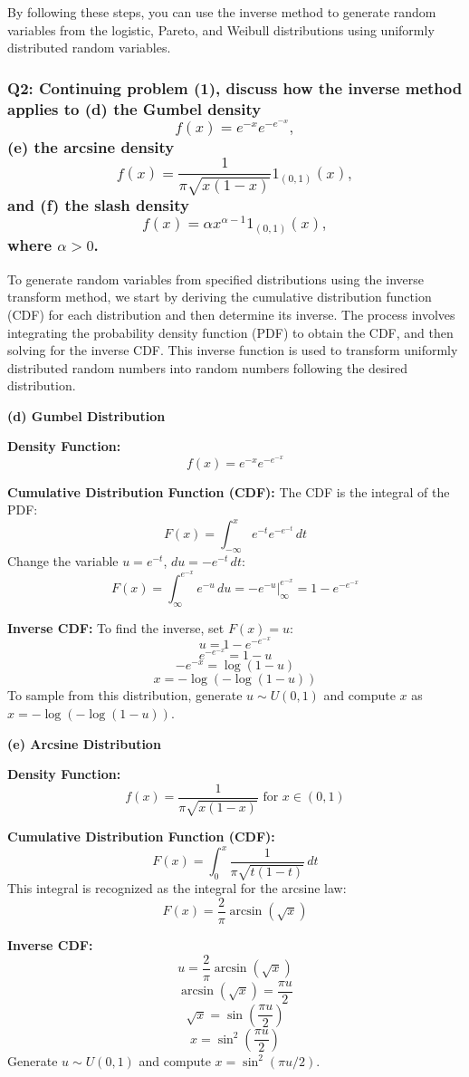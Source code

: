 \documentclass[8pt]{article}
\begin{document}
By following these steps, you can use the inverse method to generate random variables from the logistic, Pareto, and Weibull distributions using uniformly distributed random variables.

\subsubsection*{Q2:
Continuing problem (1), discuss how the inverse method applies to (d) the Gumbel density
\[
f(x) = e^{-x} e^{-e^{-x}},
\]
(e) the arcsine density
\[
f(x) = \frac{1}{\pi \sqrt{x(1-x)}} 1_{(0,1)}(x),
\]
and (f) the slash density
\[
f(x) = \alpha x^{\alpha-1} 1_{(0,1)}(x),
\]
where \(\alpha > 0\).}

To generate random variables from specified distributions using the inverse transform method, we start by deriving the cumulative distribution function (CDF) for each distribution and then determine its inverse. The process involves integrating the probability density function (PDF) to obtain the CDF, and then solving for the inverse CDF. This inverse function is used to transform uniformly distributed random numbers into random numbers following the desired distribution.

\textbf{(d) Gumbel Distribution}

\textbf{Density Function:}
\[
f(x) = e^{-x} e^{-e^{-x}}
\]

\textbf{Cumulative Distribution Function (CDF):}
The CDF is the integral of the PDF:
\[
F(x) = \int_{-\infty}^x e^{-t} e^{-e^{-t}} \, dt
\]
Change the variable \( u = e^{-t} \), \( du = -e^{-t} \, dt \):
\[
F(x) = \int_{\infty}^{e^{-x}} e^{-u} \, du = -e^{-u} \bigg|_{\infty}^{e^{-x}} = 1 - e^{-e^{-x}}
\]

\textbf{Inverse CDF:}
To find the inverse, set \( F(x) = u \):
\[
u = 1 - e^{-e^{-x}}
\]
\[
e^{-e^{-x}} = 1 - u
\]
\[
-e^{-x} = \log(1 - u)
\]
\[
x = -\log(-\log(1 - u))
\]
To sample from this distribution, generate \( u \sim U(0, 1) \) and compute \( x \) as \( x = -\log(-\log(1 - u)) \).

\textbf{(e) Arcsine Distribution}

\textbf{Density Function:}
\[
f(x) = \frac{1}{\pi \sqrt{x(1-x)}} \text{ for } x \in (0, 1)
\]

\textbf{Cumulative Distribution Function (CDF):}
\[
F(x) = \int_0^x \frac{1}{\pi \sqrt{t(1-t)}} \, dt
\]
This integral is recognized as the integral for the arcsine law:
\[
F(x) = \frac{2}{\pi} \arcsin(\sqrt{x})
\]

\textbf{Inverse CDF:}
\[
u = \frac{2}{\pi} \arcsin(\sqrt{x})
\]
\[
\arcsin(\sqrt{x}) = \frac{\pi u}{2}
\]
\[
\sqrt{x} = \sin\left(\frac{\pi u}{2}\right)
\]
\[
x = \sin^2\left(\frac{\pi u}{2}\right)
\]
Generate \( u \sim U(0, 1) \) and compute \( x = \sin^2(\pi u / 2) \).
\end{document}
